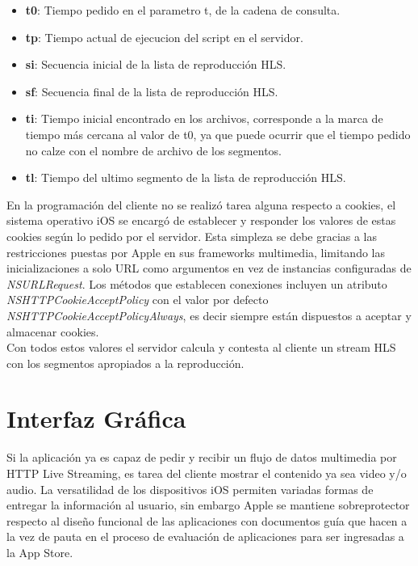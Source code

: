 \begin{itemize}
\item \textbf{t0}: Tiempo pedido en el parametro t, de la cadena de consulta.
\item \textbf{tp}: Tiempo actual de ejecucion del script en el servidor.
\item \textbf{si}: Secuencia inicial de la lista de reproducción HLS.
\item \textbf{sf}: Secuencia final de la lista de reproducción HLS.
\item \textbf{ti}: Tiempo inicial encontrado en los archivos, corresponde a la marca de tiempo más cercana al valor de t0, ya que puede ocurrir que el tiempo pedido no calze con el nombre de archivo de los segmentos.
\item \textbf{tl}: Tiempo del ultimo segmento de la lista de reproducción HLS.

\end{itemize}
 
En la programación del cliente no se realizó tarea alguna respecto a cookies, el sistema operativo iOS se encargó de establecer y responder los valores de estas cookies según lo pedido por el servidor. Esta simpleza se debe gracias a las restricciones puestas por Apple en sus frameworks multimedia, limitando las inicializaciones a solo URL como argumentos en vez de instancias configuradas de \textit{NSURLRequest}. 
Los métodos que establecen conexiones incluyen un atributo \textit{NSHTTPCookieAcceptPolicy} con el valor por defecto \textit{NSHTTPCookieAcceptPolicyAlways}, es decir siempre están dispuestos a aceptar y almacenar cookies. \\

Con todos estos valores el servidor calcula y contesta al cliente un stream HLS con los segmentos apropiados a la reproducción.
	
	
\clearpage
\section{Interfaz Gráfica}

Si la aplicación ya es capaz de pedir y recibir un flujo de datos multimedia por HTTP Live Streaming, es tarea del cliente mostrar el contenido ya sea video y/o audio. La versatilidad de los dispositivos iOS permiten variadas formas de entregar la información al usuario, sin embargo Apple se mantiene sobreprotector respecto al diseño funcional de las aplicaciones con documentos guía que hacen a la vez de pauta en el proceso de evaluación de aplicaciones para ser ingresadas a la App Store.


